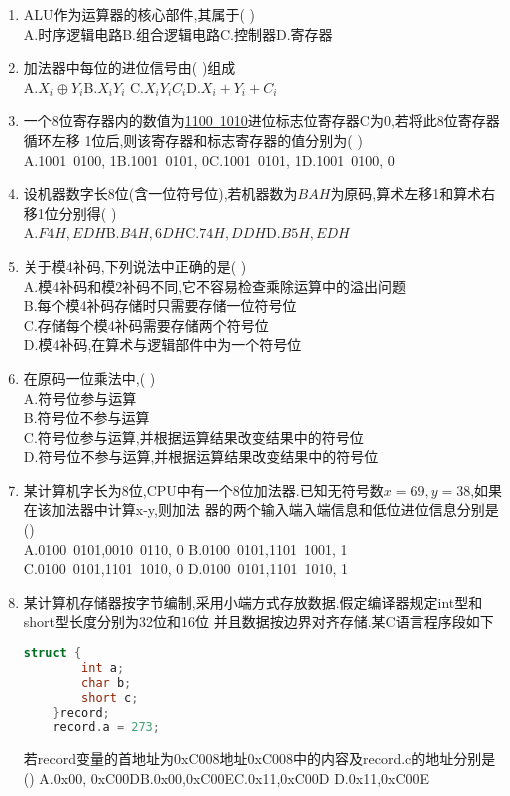 \documentclass[12pt, a4paper, oneside, UTF8]{ctexbook}
\begin{document}
\begin{enumerate}
    \item ALU作为运算器的核心部件,其属于(   ) \\
    A.时序逻辑电路\qquad B.组合逻辑电路\qquad C.控制器\qquad D.寄存器 

    \item \bl 加法器中每位的进位信号由(   )组成\\
    A.$X_i\oplus Y_i$\qquad B.$X_iY_i$ \qquad C.$X_iY_iC_i$\qquad D.$X_i+Y_i+C_i$ 

    \item 一个8位寄存器内的数值为\underline{1100\ 1010}进位标志位寄存器C为0,若将此8位寄存器循环左移
    1位后,则该寄存器和标志寄存器的值分别为(   ) \\
    A.1001\ 0100, 1\qquad B.1001\ 0101, 0\qquad C.1001\ 0101, 1\qquad D.1001\ 0100, 0

    \item 设机器数字长8位(含一位符号位),若机器数为$BAH$为原码,算术左移1和算术右移1位分别得(   ) \\
    A.$F4H,EDH$\qquad B.$B4H,6DH$\qquad C.$74H,DDH$\qquad D.$B5H,EDH$ 

    \item 关于模4补码,下列说法中正确的是(   ) \\
    A.模4补码和模2补码不同,它不容易检查乘除运算中的溢出问题 \\
    B.每个模4补码存储时只需要存储一位符号位 \\
    C.存储每个模4补码需要存储两个符号位\\ 
    D.模4补码,在算术与逻辑部件中为一个符号位 

    \item 在原码一位乘法中,(   ) \\
    A.符号位参与运算 \\
    B.符号位不参与运算 \\
    C.符号位参与运算,并根据运算结果改变结果中的符号位 \\
    D.符号位不参与运算,并根据运算结果改变结果中的符号位

    \item \bl 某计算机字长为8位,CPU中有一个8位加法器.已知无符号数$x=69,y=38$,如果在该加法器中计算x-y,则加法
    器的两个输入端入端信息和低位进位信息分别是() \\
    A.0100\ 0101,0010\ 0110, 0 \qquad B.0100\ 0101,1101\ 1001, 1 \\
    C.0100\ 0101,1101\ 1010, 0 \qquad D.0100\ 0101,1101\ 1010, 1

    \item \bt 某计算机存储器按字节编制,采用小端方式存放数据.假定编译器规定int型和short型长度分别为32位和16位
    并且数据按边界对齐存储.某C语言程序段如下
\begin{lstlisting}[language=C]
    struct {
        int a;
        char b;
        short c;
    }record;
    record.a = 273;
\end{lstlisting}
    若record变量的首地址为0xC008地址0xC008中的内容及record.c的地址分别是()
    A.0x00, 0xC00D\qquad B.0x00,0xC00E\qquad C.0x11,0xC00D \qquad D.0x11,0xC00E 


\end{enumerate}
\end{document}
